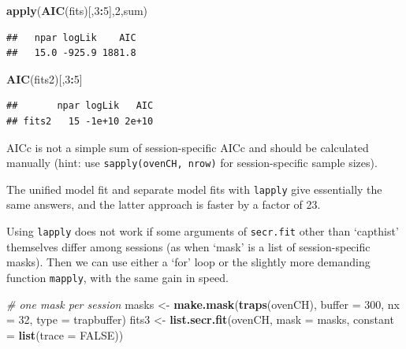 \documentclass[
]{book}
\newenvironment{Shaded}{\begin{snugshade}}{\end{snugshade}}
\newcommand{\AttributeTok}[1]{\textcolor[rgb]{0.13,0.29,0.53}{#1}}
\newcommand{\CommentTok}[1]{\textcolor[rgb]{0.56,0.35,0.01}{\textit{#1}}}
\newcommand{\ConstantTok}[1]{\textcolor[rgb]{0.56,0.35,0.01}{#1}}
\newcommand{\DecValTok}[1]{\textcolor[rgb]{0.00,0.00,0.81}{#1}}
\newcommand{\FunctionTok}[1]{\textcolor[rgb]{0.13,0.29,0.53}{\textbf{#1}}}
\newcommand{\NormalTok}[1]{#1}
\newcommand{\OtherTok}[1]{\textcolor[rgb]{0.56,0.35,0.01}{#1}}
\newcommand{\SpecialCharTok}[1]{\textcolor[rgb]{0.81,0.36,0.00}{\textbf{#1}}}
\newcommand{\StringTok}[1]{\textcolor[rgb]{0.31,0.60,0.02}{#1}}
\begin{document}
\begin{Shaded}
\begin{Highlighting}[]
\FunctionTok{apply}\NormalTok{(}\FunctionTok{AIC}\NormalTok{(fits)[,}\DecValTok{3}\SpecialCharTok{:}\DecValTok{5}\NormalTok{],}\DecValTok{2}\NormalTok{,sum)}
\end{Highlighting}
\end{Shaded}

\begin{verbatim}
##   npar logLik    AIC 
##   15.0 -925.9 1881.8
\end{verbatim}

\begin{Shaded}
\begin{Highlighting}[]
\FunctionTok{AIC}\NormalTok{(fits2)[,}\DecValTok{3}\SpecialCharTok{:}\DecValTok{5}\NormalTok{]}
\end{Highlighting}
\end{Shaded}

\begin{verbatim}
##       npar logLik   AIC
## fits2   15 -1e+10 2e+10
\end{verbatim}

AICc is not a simple sum of session-specific AICc and should be calculated manually (hint: use \texttt{sapply(ovenCH,\ nrow)} for session-specific sample sizes).

The unified model fit and separate model fits with \texttt{lapply} give essentially the same answers, and the latter approach is faster by a factor of 23.

Using \texttt{lapply} does not work if some arguments of \texttt{secr.fit} other than `capthist' themselves differ among sessions (as when `mask' is a list of session-specific masks). Then we can use either a `for' loop or the slightly more demanding function \texttt{mapply}, with the same gain in speed.

\begin{Shaded}
\begin{Highlighting}[]
\CommentTok{\# one mask per session}
\NormalTok{masks }\OtherTok{\textless{}{-}} \FunctionTok{make.mask}\NormalTok{(}\FunctionTok{traps}\NormalTok{(ovenCH), }\AttributeTok{buffer =} \DecValTok{300}\NormalTok{, }\AttributeTok{nx =} \DecValTok{32}\NormalTok{, }
    \AttributeTok{type =} \StringTok{\textquotesingle{}trapbuffer\textquotesingle{}}\NormalTok{)  }
\NormalTok{fits3 }\OtherTok{\textless{}{-}} \FunctionTok{list.secr.fit}\NormalTok{(ovenCH, }\AttributeTok{mask =}\NormalTok{ masks, }\AttributeTok{constant =} 
    \FunctionTok{list}\NormalTok{(}\AttributeTok{trace =} \ConstantTok{FALSE}\NormalTok{))}
\end{Highlighting}
\end{Shaded}
\end{document}
